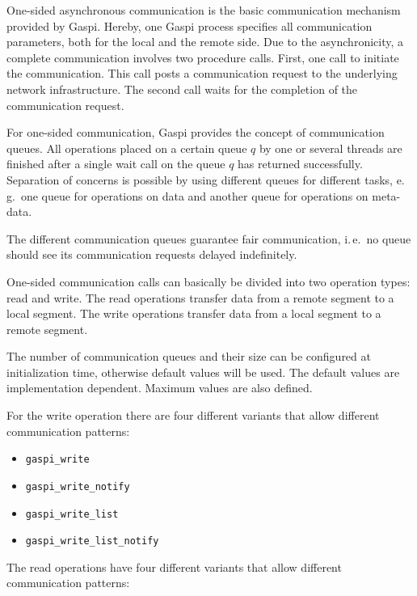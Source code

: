 \documentclass[a4paper]{article}
\newlength{\st}\setlength{\st}{0pt}
\newcommand{\zsep}[1]{#1}
\newcommand{\gaspiprefix}{gaspi}
\newcommand{\GASPI}{{\sc Gaspi}}
\newcommand{\function}[1]{{\tt #1}}
\newcommand{\gaspifunction}[1]{\function{\protect\zsep{\gaspiprefix\_#1}}}
\begin{document}
One-sided asynchronous communication is the basic communication
mechanism provided by \GASPI{}. Hereby, one \GASPI{} process specifies
all communication parameters, both for the local and the remote
side. Due to the asynchronicity, a complete communication
involves two procedure calls. First, one call to initiate the
communication. This call posts a communication request to the
underlying network infrastructure. The second call waits for the
completion of the communication request.

For one-sided communication, \GASPI{} provides the concept of communication
queues.  All operations placed on a certain queue $q$ by one or
several threads are finished after a single wait call on the queue $q$ has
returned successfully. Separation of concerns is possible by using different queues
for different tasks, e.\,g.\ one queue for operations on data and
another queue for operations on meta-data.

The different communication queues guarantee fair communication, i.\,e.\ no queue
should see its communication requests delayed indefinitely. 


One-sided communication calls can basically be divided into two
operation types: read and write.
The read operations transfer data from a remote segment
to a local segment. The write operations transfer data from a local segment
to a remote segment.


The number of communication queues and their size can be configured at initialization
time, otherwise default values will be used. The default values are implementation
dependent. Maximum values are also defined.

For the write operation there are four different variants that allow different
communication patterns:

\begin{itemize}
\item \gaspifunction{write}
\item \gaspifunction{write\_notify}
\item \gaspifunction{write\_list}
\item \gaspifunction{write\_list\_notify}
\end{itemize}

The read operations have four different variants that allow different
communication patterns:
\end{document}
